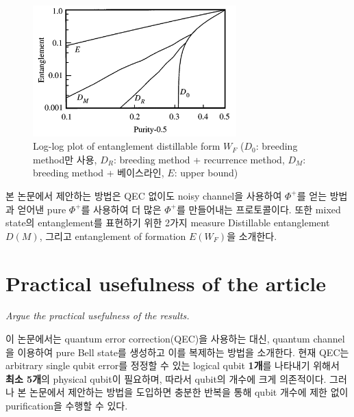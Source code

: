 \documentclass[
]{kaohandt}
\begin{document}
\begin{figure}[h]
    \centering
    \includegraphics[width=0.7\textwidth]{image/figure_1.png}
    \caption{Log-log plot of entanglement distillable form $W_F$ ($D_0$: breeding method만 사용, $D_R$: breeding method + recurrence method, $D_M$: breeding method + 베이스라인, $E$: upper bound)}
    \label{fig:plot}
\end{figure}

본 논문에서 제안하는 방법은 QEC 없이도 noisy channel을 사용하여 $\Phi^+$를 얻는 방법과 얻어낸 pure $\Phi^+$를 사용하여 더 많은 $\Phi^+$를 만들어내는 프로토콜이다. 또한 mixed state의 entanglement를 표현하기 위한 2가지 measure Distillable entanglement $D(M)$, 그리고 entanglement of formation $E(W_F)$을 소개한다.
\section{Practical usefulness of the article}
\begin{kaobox}
    \textit{Argue the practical usefulness of the results.}
\end{kaobox}
이 논문에서는 quantum error correction(QEC)을 사용하는 대신, quantum channel을 이용하여 pure Bell state를 생성하고 이를 복제하는 방법을 소개한다. 현재 QEC는 arbitrary single qubit error를 정정할 수 있는 logical qubit \textbf{1개}를 나타내기 위해서 \textbf{최소 5개}의 physical qubit이 필요하며, 따라서 qubit의 개수에 크게 의존적이다.
그러나 본 논문에서 제안하는 방법을 도입하면 충분한 반복을 통해 qubit 개수에 제한 없이 purification을 수행할 수 있다.
\end{document}
